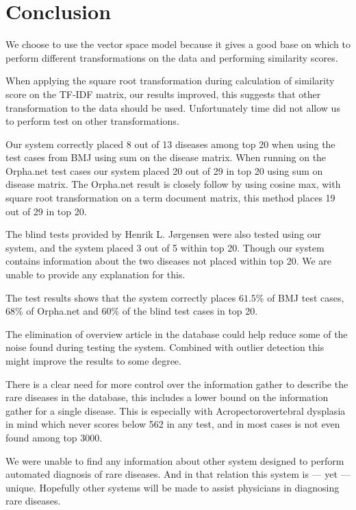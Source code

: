 \chapter{Conclusion\label{Conclusion}}

We choose to use the vector space model because it gives a good base
on which to perform different transformations on the data and performing
similarity scores.

When applying the square root transformation during calculation of
similarity score on the TF-IDF matrix, our results improved, this
suggests that other transformation to the data should be
used. Unfortunately time did not allow us to perform test on other
transformations.

Our system correctly placed 8 out of 13 diseases among top 20 when
using the test cases from BMJ using sum on the disease matrix. When
running on the Orpha.net test cases our system placed 20 out of 29 in
top 20 using sum on disease matrix. The Orpha.net result is closely
follow by using cosine max, with square root transformation on a term
document matrix, this method places 19 out of 29 in top 20.

The blind tests provided by Henrik L. J\o rgensen were also tested
using our system, and the system placed 3 out of 5 within top
20. Though our system contains information about the two diseases not
placed within top 20. We are unable to provide any explanation for
this.

The test results shows that the system correctly places $61.5\%$ of
BMJ test cases, $68\%$ of Orpha.net and $60\%$ of the blind test cases
in top 20.

The elimination of overview article in the database could help reduce
some of the noise found during testing the system. Combined with
outlier detection this might improve the results to some degree.

There is a clear need for more control over the information gather to
describe the rare diseases in the database, this includes a lower
bound on the information gather for a single disease. This is
especially with Acropectorovertebral dysplasia in mind which never
scores below 562 in any test, and in most cases is not even found
among top 3000.

We were unable to find any information about other system designed to
perform automated diagnosis of rare diseases. And in that relation
this system is --- yet --- unique. Hopefully other systems will be
made to assist physicians in diagnosing rare diseases.

